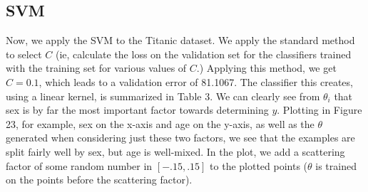 \documentclass[10pt,letterpaper]{article}
\begin{document}
\subsection{SVM}
Now, we apply the SVM to the Titanic dataset. We apply the standard method to select $C$ (ie, calculate the loss on the validation set for the classifiers trained with the training set for various values of $C$.) Applying this method, we get $C = 0.1$, which leads to a validation error of 81.1067. The classifier this creates, using a linear kernel, is summarized in Table 3. We can clearly see from $\theta_i$ that sex is by far the most important factor towards determining $y$. Plotting in Figure 23, for example, sex on the x-axis and age on the y-axis, as well as the $\theta$ generated when considering just these two factors, we see that the examples are split fairly well by sex, but age is well-mixed. In the plot, we add a scattering factor of some random number in $[-.15,.15]$ to the plotted points ($\theta$ is trained on the points before the scattering factor).
\end{document}
